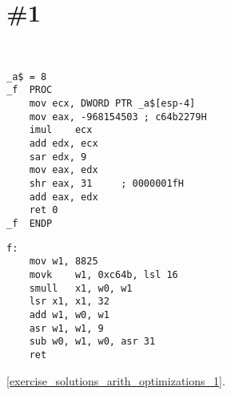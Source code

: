 ﻿\section{\Exercise \#1}
\label{exercise_arith_optimizations_1}

\WhatThisCodeDoes\

\begin{lstlisting}[caption=\Optimizing MSVC 2010]
_a$ = 8
_f	PROC
	mov	ecx, DWORD PTR _a$[esp-4]
	mov	eax, -968154503	; c64b2279H
	imul	ecx
	add	edx, ecx
	sar	edx, 9
	mov	eax, edx
	shr	eax, 31		; 0000001fH
	add	eax, edx
	ret	0
_f	ENDP
\end{lstlisting}

\begin{lstlisting}[caption=\Optimizing GCC 4.9 (ARM64)]
f:
	mov	w1, 8825
	movk	w1, 0xc64b, lsl 16
	smull	x1, w0, w1
	lsr	x1, x1, 32
	add	w1, w0, w1
	asr	w1, w1, 9
	sub	w0, w1, w0, asr 31
	ret
\end{lstlisting}

\Answer\: \ref{exercise_solutions_arith_optimizations_1}.

